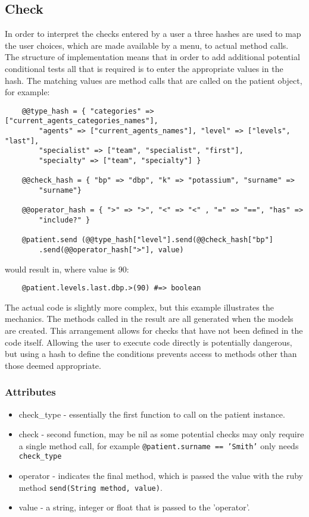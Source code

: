 \documentclass[letterpaper]{amsart}
\begin{document}
\subsection{Check}
In order to interpret the checks entered by a user a three hashes are used to map the user choices, which are made available by a menu, to actual method calls.  The structure of implementation means that in order to add additional potential conditional tests all that is required is to enter the appropriate values in the hash.  The matching values are method calls that are called on the patient object, for example:\\
\begin{verbatim}
    @@type_hash = { "categories" => ["current_agents_categories_names"], 
	    "agents" => ["current_agents_names"], "level" => ["levels", "last"], 
	    "specialist" => ["team", "specialist", "first"], 
	    "specialty" => ["team", "specialty"] }  

    @@check_hash = { "bp" => "dbp", "k" => "potassium", "surname" => 
	    "surname"}

    @@operator_hash = { ">" => ">", "<" => "<" , "=" => "==", "has" => 
	    "include?" }

    @patient.send (@@type_hash["level"].send(@@check_hash["bp"]
	    .send(@@operator_hash[">"], value)

\end{verbatim}
would result in, where value is 90:\\
\begin{verbatim}
    @patient.levels.last.dbp.>(90) #=> boolean

\end{verbatim}
The actual code is slightly more complex, but this example illustrates the mechanics.  The methods called in the result are all generated when the models are created.  This arrangement allows for checks that have not been defined in the code itself.  Allowing the user to execute code directly is potentially dangerous, but using a hash to define the conditions prevents access to methods other than those deemed appropriate.

\subsubsection{Attributes}
\begin{itemize}
    \item check\_type - essentially the first function to call on the patient instance.
    \item check - second function, may be nil as some potential checks may only require a single method call, for example \texttt{@patient.surname == 'Smith'} only needs \texttt{check\_type}
    \item operator - indicates the final method, which is passed the value with the ruby method \texttt{send(String method, value)}.
    \item value - a string, integer or float that is passed to the 'operator'.
\end{itemize}
\end{document}
